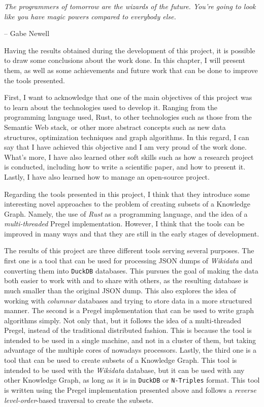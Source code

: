 \epigraph{\textit{The programmers of tomorrow are the wizards of the future. You're going to look like you have magic powers compared to everybody else.}}{-- \textup{Gabe Newell}}

Having the results obtained during the development of this project, it is possible to draw some conclusions about the work done. In this chapter, I will present them, as well as some achievements and future work that can be done to improve the tools presented.

First, I want to acknowledge that one of the main objectives of this project was to learn about the technologies used to develop it. Ranging from the programming language used, Rust, to other technologies such as those from the Semantic Web stack, or other more abstract concepts such as new data structures, optimization techniques and graph algorithms. In this regard, I can say that I have achieved this objective and I am very proud of the work done. What's more, I have also learned other soft skills such as how a research project is conducted, including how to write a scientific paper, and how to present it. Lastly, I have also learned how to manage an open-source project.

Regarding the tools presented in this project, I think that they introduce some interesting novel approaches to the problem of creating subsets of a Knowledge Graph. Namely, the use of \textit{Rust} as a programming language, and the idea of a \textit{multi-threaded} Pregel implementation. However, I think that the tools can be improved in many ways and that they are still in the early stages of development.

The results of this project are three different tools serving several purposes. The first one is a tool that can be used for processing JSON dumps of \textit{Wikidata} and converting them into \texttt{DuckDB} databases. This pursues the goal of making the data both easier to work with and to share with others, as the resulting database is much smaller than the original JSON dump. This also explores the idea of working with \textit{columnar} databases and trying to store data in a more structured manner. The second is a Pregel implementation that can be used to write graph algorithms simply. Not only that, but it follows the idea of a multi-threaded Pregel, instead of the traditional distributed fashion. This is because the tool is intended to be used in a single machine, and not in a cluster of them, but taking advantage of the multiple cores of nowadays processors. Lastly, the third one is a tool that can be used to create subsets of a Knowledge Graph. This tool is intended to be used with the \textit{Wikidata} database, but it can be used with any other Knowledge Graph, as long as it is in \texttt{DuckDB} or \texttt{N-Triples} format. This tool is written using the Pregel implementation presented above and follows a \textit{reverse level-order}-based traversal to create the subsets.

